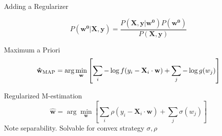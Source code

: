 \documentclass[pdf]{beamer}
\newcommand{\ra}{\rightarrow}
\begin{document}
%
%
%
%
%
%
%
%
%
%
%








\begin{frame}[t]{Adding a Regularizer}

    \begin{equation*}
        P(\mathbf{w^0}|\mathbf{X},\mathbf{y}) = \frac{P(\mathbf{X},\mathbf{y}|\mathbf{w^0})P(\mathbf{w^0})}{P(\mathbf{X},\mathbf{y})}
    \end{equation*}

    \begin{block}{Maximum a Priori}
        \begin{equation*}
            \small{\mathbf{\hat{w}_{\text{MAP}}} =\arg\min_{\mathbf{w}}{\left[\sum_i{-\log f(y_i - \mathbf{X}_i\cdot \mathbf{w})} +\sum_j{-\log{g(w_j)}}\right]}}
        \end{equation*}
    \end{block}

    \begin{block}{Regularized M-estimation}
    \begin{equation*}
        \mathbf{\hat{w}}=\arg \min_{\mathbf{w}}{\left[ \sum_{i} {\rho\left( y_i - \mathbf{X}_{i} \cdot \mathbf{w}\right)} + \sum_j{\sigma(w_j)}\right]}
    \end{equation*}
    Note separability. Solvable for convex strategy $\sigma,\rho$
    \end{block}

\end{frame}
\end{document}

